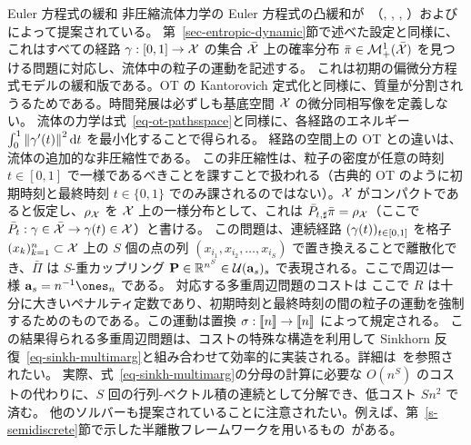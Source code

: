 \begin{rem2}{Euler 方程式の緩和}
非圧縮流体力学の Euler 方程式の凸緩和が~\citeauthor{BrenierGeneralized}（\citeyear{BrenierEulerAMS}, \citeyear{BrenierEulerARMA}, \citeyear{BrenierEulerCPAM}, \citeyear{BrenierGeneralized}）および \citep{AmbrosioFigalliEuler}によって提案されている。
第~\ref{sec-entropic-dynamic}節で述べた設定と同様に、これはすべての経路 $\gamma : [0,1] \rightarrow \mathcal{X}$ の集合 $\bar{\mathcal{X}}$ 上の確率分布 $\bar\pi \in \mathcal{M}_+^1(\bar{\mathcal{X}})$ を見つける問題に対応し、流体中の粒子の運動を記述する。
これは初期の偏微分方程式モデルの緩和版である。OT の Kantorovich 定式化と同様に、質量が分割されうるためである。時間発展は必ずしも基底空間 $\mathcal{X}$ の微分同相写像を定義しない。
流体の力学は式~\eqref{eq-ot-pathsspace}と同様に、各経路のエネルギー $\int_0^1 \left\| \gamma'(t) \right\|^2 \mathrm{d} t$ を最小化することで得られる。
経路の空間上の OT との違いは、流体の追加的な非圧縮性である。
この非圧縮性は、粒子の密度が任意の時刻 $t \in [0,1]$ で一様であるべきことを課すことで扱われる（古典的 OT のように初期時刻と最終時刻 $t \in \{0,1\}$ でのみ課されるのではない）。$\mathcal{X}$ がコンパクトであると仮定し、$\rho_{\mathcal{X}}$ を $\mathcal{X}$ 上の一様分布として、これは $\bar P_{t,\sharp} \bar\pi = \rho_{\mathcal{X}}$（ここで $\bar P_t : \gamma \in \bar{\mathcal{X}} \rightarrow \gamma(t) \in \mathcal{X}$）と書ける。
この問題は、連続経路 $(\gamma(t))_{t \in [0,1]}$ を格子 $(x_k)_{k=1}^n \subset \mathcal{X}$ 上の $S$ 個の点の列 $(x_{i_1}, x_{i_2},\ldots,x_{i_S})$ で置き換えることで離散化でき、$\bar\Pi$ は $S$-重カップリング $\mathrm{\textbf{P}} \in \mathbb{R}^{n^S} \in \mathcal{U}(\mathrm{\textbf{a}}_s)_s$ で表現される。ここで周辺は一様 $\a_s=n^{-1} \ones_n$ である。
対応する多重周辺問題のコストは
ここで $R$ は十分に大きいペナルティ定数であり、初期時刻と最終時刻の間の粒子の運動を強制するためのものである。この運動は置換 $\sigma : \llbracket n\rrbracket \rightarrow \llbracket n\rrbracket$ によって規定される。
この結果得られる多重周辺問題は、コストの特殊な構造を利用して Sinkhorn 反復~\eqref{eq-sinkh-multimarg}と組み合わせて効率的に実装される。詳細は~\citep{2015-benamou-cisc}を参照されたい。
実際、式~\eqref{eq-sinkh-multimarg}の分母の計算に必要な $O(n^S)$ のコストの代わりに、$S$ 回の行列-ベクトル積の連続として分解でき、低コスト $Sn^2$ で済む。
他のソルバーも提案されていることに注意されたい。例えば、第~\ref{s-semidiscrete}節で示した半離散フレームワークを用いるもの~\citep{deGoes2015,gallouet2017lagrangian}がある。
\end{rem2}


